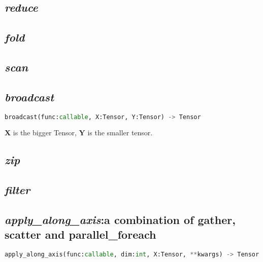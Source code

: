 \subsection{\textbf{\textit{reduce}}}

\subsection{\textbf{\textit{fold}}}

\subsection{\textbf{\textit{scan}}}

\subsection{\textbf{\textit{broadcast}}}

\begin{lstlisting}[language=Python]
broadcast(func:callable, X:Tensor, Y:Tensor) -> Tensor
\end{lstlisting}

$\mathbf{X}$ is the bigger Tensor, $\mathbf{Y}$ is the smaller tensor.

\subsection{\textbf{\textit{zip}}}

\subsection{\textbf{\textit{filter}}}

\subsection{\textbf{\textit{apply\_along\_axis}}:a combination of gather, scatter and parallel\_foreach}

\begin{lstlisting}[language=Python]
apply_along_axis(func:callable, dim:int, X:Tensor, **kwargs) -> Tensor
\end{lstlisting}

